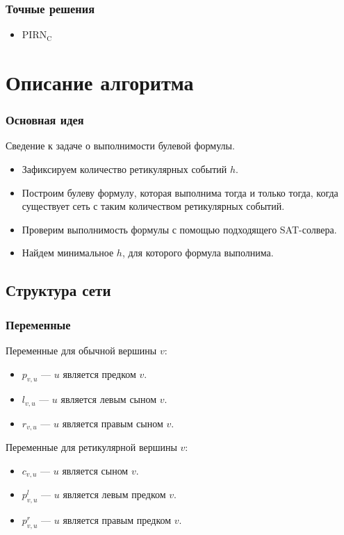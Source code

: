 \documentclass[hyperref={unicode}]{beamer}
\begin{document}
\begin{frame}
\frametitle{Точные решения}

\begin{itemize}
	\item $\mathrm{PIRN_C}$
\end{itemize}

\end{frame}

\section{Описание алгоритма}

\begin{frame}
\frametitle{Основная идея}

Сведение к задаче о выполнимости булевой формулы.

\begin{itemize}
	\item Зафиксируем количество ретикулярных событий $h$.
	\item Построим булеву формулу, которая выполнима тогда и только тогда, когда существует сеть с таким количеством ретикулярных событий.
	\item Проверим выполнимость формулы с помощью подходящего SAT-солвера.
	\item Найдем минимальное $h$, для которого формула выполнима.
\end{itemize}

\end{frame}

\subsection{Структура сети}

\begin{frame}
\frametitle{Переменные}

Переменные для обычной вершины $v$:

\begin{itemize}
	\item $p_{v, u}$ --- $u$ является предком $v$.
	\item $l_{v, u}$ --- $u$ является левым сыном $v$.
	\item $r_{v, u}$ --- $u$ является правым сыном $v$.
\end{itemize}

Переменные для ретикулярной вершины $v$:

\begin{itemize}
	\item $c_{v, u}$ --- $u$ является сыном $v$.
	\item $p^l_{v, u}$ --- $u$ является левым предком $v$.
	\item $p^r_{v, u}$ --- $u$ является правым предком $v$.
\end{itemize}

\end{frame}
\end{document}
